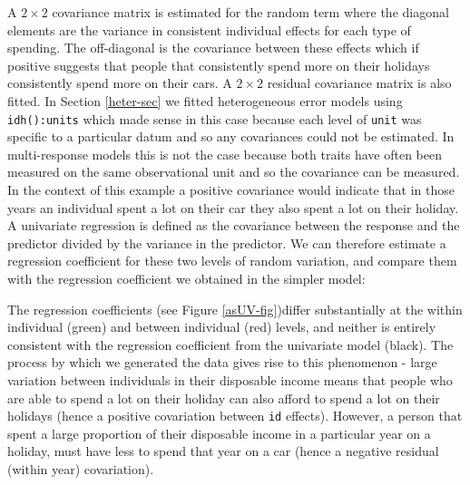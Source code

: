 \documentclass{article}
\begin{document}
A $2\times2$ covariance matrix is estimated for the random term where the diagonal elements are the variance in consistent individual effects for each type of spending. The off-diagonal is the covariance between these effects which if positive suggests that people that consistently spend more on their holidays consistently spend more on their cars. A $2\times2$ residual covariance matrix is also fitted. In Section \ref{heter-sec}  we fitted heterogeneous error models using \texttt{idh():units} which made sense in this case because each level of \texttt{unit} was specific to a particular datum and so any covariances could not be estimated.   In multi-response models this is not the case because both traits have often been measured on the same observational unit and so the covariance can be measured. In the context of this example a positive covariance would indicate that in those years an individual spent a lot on their car they also spent a lot on their holiday.\\

A univariate regression is defined as the covariance between the response and the predictor divided by the variance in the predictor. We can therefore estimate a regression coefficient for these two levels of random variation, and compare them with the regression coefficient we obtained in the simpler model:
 
\begin{Schunk}
\end{Schunk}

The regression coefficients (see Figure \ref{asUV-fig})differ substantially at the within individual (green) and between individual (red) levels, and neither is entirely consistent with the regression coefficient from the univariate model (black). The process by which we generated the data gives rise to this phenomenon - large variation between individuals in their disposable income means that people who are able to spend a lot on their holiday can also afford to spend a lot on their holidays (hence a positive covariation between \texttt{id} effects). However, a person that spent a large proportion of their disposable income in a particular year on a holiday, must have less to spend that year on a car (hence a negative residual (within year) covariation). \\    
\end{document}

